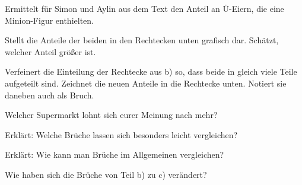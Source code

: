 \documentclass[13pt, a4paper]{scrartcl}
\begin{document}
\begin{teilaufgaben}
	\item Ermittelt für Simon und Aylin aus dem Text den Anteil an Ü-Eiern, die eine Minion-Figur enthielten.
	\item Stellt die Anteile der beiden in den Rechtecken unten grafisch dar. Schätzt, welcher Anteil größer ist.
	
	\begin{center}
	\end{center}
	\item Verfeinert die Einteilung der Rechtecke aus b) so, dass beide in gleich viele Teile aufgeteilt sind. Zeichnet die neuen Anteile in die Rechtecke unten. Notiert sie daneben auch als Bruch.
	
	\begin{center}
	\end{center}
	\item Welcher Supermarkt lohnt sich eurer Meinung nach mehr?
	
	\begin{center}
		\linie
	\end{center}
	\item Erklärt: Welche Brüche lassen sich besonders leicht vergleichen?
	\item[\symStern] Erklärt: Wie kann man Brüche im Allgemeinen vergleichen?
	\item[\symStern] Wie haben sich die Brüche von Teil b) zu c) verändert?
\end{teilaufgaben}
\end{document}
